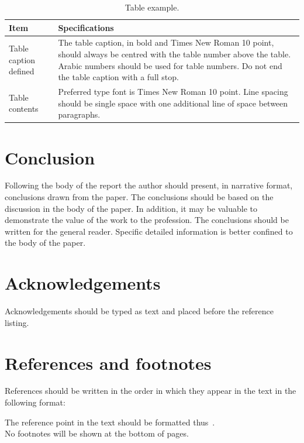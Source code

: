 \documentclass[12pt, a4paper]{article}
\begin{document}
\begin{table}[H]
  \centering
  \caption{Table example.}\label{tab:my_label}
  \begin{footnotesize}
    \begin{tabular}{p{6cm}p{8.7cm}}
      \hline
      Item                  & Specifications                                                                                                                                                                                                             \\\hline
      Table caption defined & The table caption, in bold and Times New Roman 10 point, should always be centred with the table number above the table.  Arabic numbers should be used for table numbers.  Do not end the table caption with a full stop. \\\hline
      Table contents        & Preferred type font is Times New Roman 10 point.  Line spacing should be single space with one additional line of space between paragraphs.                                                                                \\\hline
    \end{tabular}
  \end{footnotesize}
\end{table}

\section{Conclusion}
Following the body of the report the author should present, in narrative format, conclusions drawn from the paper. The conclusions should be based on the discussion in the body of the paper. In addition, it may be valuable to demonstrate the value of the work to the profession. The conclusions should be written for the general reader. Specific detailed information is better confined to the body of the paper.

\section*{Acknowledgements}
Acknowledgements should be typed as text and placed before the reference listing.

\section*{References and footnotes}
References should be written in the order in which they appear in the text in the following format:

\printbibliography[heading=none]

The reference point in the text should be formatted thus~\cite{Tan1977}.\\

No footnotes will be shown at the bottom of pages.
\end{document}
